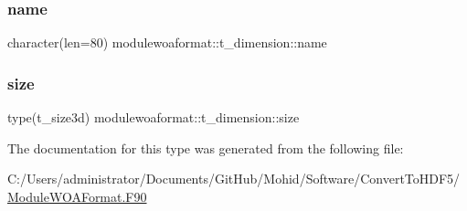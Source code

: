 \subsubsection{\texorpdfstring{name}{name}}
{\footnotesize\ttfamily character(len=80) modulewoaformat\+::t\+\_\+dimension\+::name\hspace{0.3cm}{\ttfamily [private]}}

\mbox{\label{structmodulewoaformat_1_1t__dimension_ac851e48eeddc8280dab7d6fdce09134f}} 
\subsubsection{\texorpdfstring{size}{size}}
{\footnotesize\ttfamily type(t\+\_\+size3d) modulewoaformat\+::t\+\_\+dimension\+::size\hspace{0.3cm}{\ttfamily [private]}}



The documentation for this type was generated from the following file\+:\begin{DoxyCompactItemize}
\item 
C\+:/\+Users/administrator/\+Documents/\+Git\+Hub/\+Mohid/\+Software/\+Convert\+To\+H\+D\+F5/\mbox{\hyperlink{_module_w_o_a_format_8_f90}{Module\+W\+O\+A\+Format.\+F90}}\end{DoxyCompactItemize}
